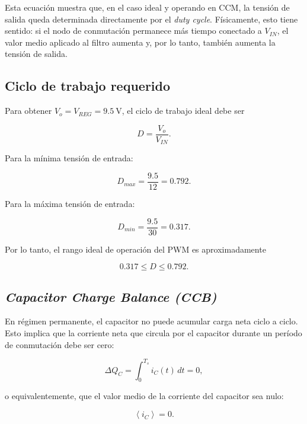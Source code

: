 \documentclass[a4paper,12pt]{article}
\begin{document}
Esta ecuación muestra que, en el caso ideal y operando en CCM, la tensión de salida queda determinada directamente por el \textit{duty cycle}. Físicamente, esto tiene sentido: si el nodo de conmutación permanece más tiempo conectado a $V_{IN}$, el valor medio aplicado al filtro aumenta y, por lo tanto, también aumenta la tensión de salida.

\subsection{Ciclo de trabajo requerido}

Para obtener $V_o = V_{REG} = 9.5\ \si{\volt}$, el ciclo de trabajo ideal debe ser

\begin{equation}
    D = \frac{V_o}{V_{IN}}.
\end{equation}

Para la mínima tensión de entrada:

\begin{equation}
    D_{max} = \frac{9.5}{12} = 0.792.
\end{equation}

Para la máxima tensión de entrada:

\begin{equation}
    D_{min} = \frac{9.5}{30} = 0.317.
\end{equation}

Por lo tanto, el rango ideal de operación del PWM es aproximadamente

\begin{equation}
    \boxed{0.317 \leq D \leq 0.792}.
\end{equation}

\subsection{\textit{Capacitor Charge Balance (CCB)}}

En régimen permanente, el capacitor no puede acumular carga neta ciclo a ciclo. Esto implica que la corriente neta que circula por el capacitor durante un período de conmutación debe ser cero:

\begin{equation}
    \Delta Q_C = \int_0^{T_s} i_C(t)\, dt = 0,
\end{equation}

o equivalentemente, que el valor medio de la corriente del capacitor sea nulo:

\begin{equation}
    \left< i_C \right> = 0.
\end{equation}
\end{document}
